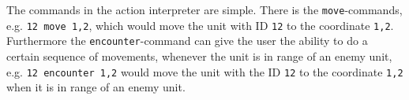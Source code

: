 The commands in the action interpreter are simple. There is the \texttt{move}-commands, e.g. \texttt{12 move 1,2}, which would move the unit with ID \texttt{12} to the coordinate \texttt{1,2}.
\\
Furthermore the \texttt{encounter}-command can give the user the ability to do a certain sequence of movements, whenever the unit is in range of an enemy unit, e.g. \texttt{12 encounter 1,2} would move the unit with the ID \texttt{12} to the coordinate \texttt{1,2} when it is in range of an enemy unit.


